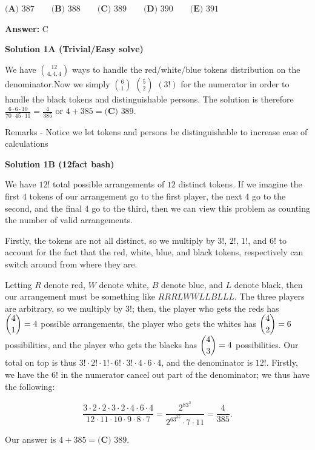 \begin{enumerate}
 $\textbf{(A) }387 \qquad \textbf{(B) }388 \qquad \textbf{(C) }389 \qquad \textbf{(D) }390 \qquad \textbf{(E) }391 \qquad$

 \textbf{Answer: }C



\textbf{Solution 1A (Trivial/Easy solve)}

We have $\binom{12}{4,4,4}$ ways to handle the red/white/blue tokens distribution on the denominator.Now we simply $\binom{6}{1}$ $\binom{5}{2}$ $(3!)$ for the numerator in order to handle the black tokens and distinguishable persons. The solution is therefore $\frac {6 \cdot 6 \cdot 10}{70 \cdot 45 \cdot 11} = \frac {4}{385}$ or $4+385=\boxed{\textbf{(C) }389}.$

 Remarks - Notice we let tokens and persons be distinguishable to increase ease of calculations

 



\textbf{Solution 1B (12fact bash)}

We have $12!$ total possible arrangements of $12$ distinct tokens. If we imagine the first $4$ tokens of our arrangement go to the first player, the next $4$ go to the second, and the final $4$ go to the third, then we can view this problem as counting the number of valid arrangements. 

 Firstly, the tokens are not all distinct, so we multiply by $3!$, $2!$, $1!$, and $6!$ to account for the fact that the red, white, blue, and black tokens, respectively can switch around from where they are. 

 Letting $R$ denote red, $W$ denote white, $B$ denote blue, and $L$ denote black, then our arrangement must be something like $RRRLWWLLBLLL$. The three players are arbitrary, so we multiply by $3!$; then, the player who gets the reds has $\dbinom41=4$ possible arrangements, the player who gets the whites has $\dbinom42=6$ possibilities, and the player who gets the blacks has $\dbinom43=4$ possibilities. Our total on top is thus $3!\cdot2!\cdot1!\cdot6!\cdot3!\cdot4\cdot6\cdot4$, and the denominator is $12!$. Firstly, we have the $6!$ in the numerator cancel out part of the denominator; we thus have the following: 

 
 \[\dfrac{3\cdot2\cdot2\cdot3\cdot2\cdot4\cdot6\cdot4}{12\cdot11\cdot10\cdot9\cdot8\cdot7}=\dfrac{2^83^3}{2^63^35\cdot7\cdot11}=\dfrac4{385}.\]

 Our answer is $4+385=\boxed{\textbf{(C) }389}.$





\end{enumerate}
